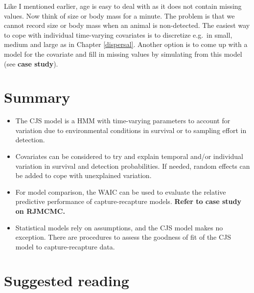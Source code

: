 \documentclass[
  12pt,
]{krantz}
\begin{document}
Like I mentioned earlier, age is easy to deal with as it does not contain missing values. Now think of size or body mass for a minute. The problem is that we cannot record size or body mass when an animal is non-detected. The easiest way to cope with individual time-varying covariates is to discretize e.g.~in small, medium and large as in Chapter \ref{dispersal}. Another option is to come up with a model for the covariate and fill in missing values by simulating from this model (see \textbf{case study}).

\hypertarget{summary-3}{%
\section{Summary}\label{summary-3}}

\begin{itemize}
\item
  The CJS model is a HMM with time-varying parameters to account for variation due to environmental conditions in survival or to sampling effort in detection.
\item
  Covariates can be considered to try and explain temporal and/or individual variation in survival and detection probabilities. If needed, random effects can be added to cope with unexplained variation.
\item
  For model comparison, the WAIC can be used to evaluate the relative predictive performance of capture-recapture models. \textbf{Refer to case study on RJMCMC.}
\item
  Statistical models rely on assumptions, and the CJS model makes no exception. There are procedures to assess the goodness of fit of the CJS model to capture-recapture data.
\end{itemize}

\hypertarget{suggested-reading-3}{%
\section{Suggested reading}\label{suggested-reading-3}}
\end{document}
